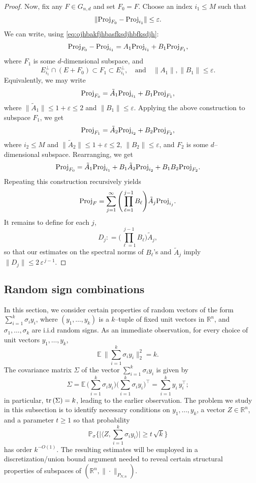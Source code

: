 \documentclass[11pt]{amsart}
\theoremstyle{definition}
\theoremstyle{plain}
\newcommand{\R}{\mathbb{R}}
\def\Prob{{\mathbb P}}
\def\R{{\mathbb R}}
\def\Prob{{\mathbb P}}
\def\Exp{{\mathbb E}}
\def\Proj{{\rm Proj}}
\begin{document}
\begin{proof}
Now, fix any $F \in G_{n,d}$ and set $F_0 = F$.  
Choose an index $i_1 \le M$ such that
\[
\|\Proj_{F_0} - \Proj_{i_1}\| \le \varepsilon.
\]
We can write, using \eqref{eq:ojhbakfjhbasfksdjhbfksdjh}:
\[
\Proj_{F_0} - \Proj_{i_1} 
= A_1 \Proj_{i_1} + B_1 \Proj_{F_1},
\]
where $F_1$ is some $d$-dimensional subspace, and
\[
E_{i_1}^\perp \cap (E+F_0)
\subset F_1 \subset E_{i_1}^\perp,
\quad \text{and} \quad
\|A_1\|, \|B_1\| \le \varepsilon.
\]
Equivalently, we may write
\[
\Proj_{F_0} = \tilde A_1 \Proj_{i_1} + B_1 \Proj_{F_1},
\]
where $\|\tilde A_1\| \le 1 + \varepsilon \le 2$ and $\|B_1\| \le \varepsilon$.  
Applying the above construction to subspace $F_1$,
we get
$$
\Proj_{F_1} = \tilde A_2 \Proj_{i_2} + B_2 \Proj_{F_2},
$$
where $i_2\leq M$ and
$\|\tilde A_2\| \le 1 + \varepsilon \le 2$, $\|B_2\| \le \varepsilon$,
and $F_2$ is some $d$--dimensional subspace.
Rearranging, we get
$$
\Proj_{F_0} = \tilde A_1 \Proj_{i_1} +
B_1 \tilde A_2 \Proj_{i_2} + B_1 B_2 \Proj_{F_2}.
$$
Repeating this construction recursively yields
\[
\Proj_{F}
  = \sum_{j=1}^\infty
      \Bigg( \prod_{\ell=1}^{j-1} B_\ell \Bigg)
      \tilde A_j \Proj_{i_j}.
\]
It remains to define for each $j$,
$$
D_j: = \Bigg( \prod_{\ell=1}^{j-1} B_\ell \Bigg)
      \tilde A_j,
$$
so that our estimates on the spectral norms of $B_\ell$'s and $\tilde A_j$ imply
$\|D_j\| \le 2\, \varepsilon^{\,j-1}$.  
\end{proof}







\subsection{Random sign combinations}
In this section, we consider certain properties
of random vectors of the form $\sum_{i=1}^k \sigma_i y_i$,
where $(y_1,\dots,y_k)$
is a $k$--tuple of fixed unit vectors in $\R^n$,
and $\sigma_1,\dots,\sigma_k$ are i.i.d random signs.
As an immediate observation, for every choice of unit vectors $y_1,\dots,y_k$,
$$
\Exp\,\Big\|\sum_{i=1}^k \sigma_i y_i\Big\|_2^2
=k.
$$
The covariance matrix $\Sigma$
of the vector $\sum_{i=1}^k \sigma_i y_i$ is given by
$$
\Sigma=\Exp\,\Big(\sum_{i=1}^k \sigma_i y_i\Big)
\Big(\sum_{i=1}^k \sigma_i y_i\Big)^\top
=\sum_{i=1}^k y_i\,y_i^\top;
$$
in particular, ${\rm tr}\,(\Sigma)=k$, leading to the earlier observation.
The problem we study in this subsection is to identify
necessary conditions on $y_1,\dots,y_k$, a vector $Z\in\R^n$, and a parameter $t\geq 1$
so that probability
$$
\Prob_\sigma
\Big\{
\big|\big\langle Z,\sum_{i=1}^k \sigma_i y_i\big\rangle\big|
\geq t\,\sqrt{k}
\Big\}
$$
has order $k^{-O(1)}$.
The resulting estimates will be employed in a discretization/union bound argument needed to reveal certain structural properties of subspaces of $(\R^n,\|\cdot\|_{P_{N,n}})$.
\end{document}
